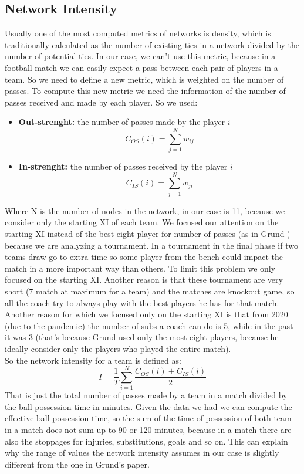 \documentclass[12pt, a4paper]{article}
\begin{document}
\subsection{Network Intensity}
Usually one of the most computed metrics of networks is density, which
is traditionally calculated as the number of existing ties in a network divided by the number of potential ties. In our case, we can't use this metric, because in a football match we can easily expect a pass between each pair of players in a team. So we need to define a new metric, which is weighted on the number of passes. To compute this new metric we need the information of the number of passes received and made by each player. So we used: 
\begin{itemize}
        \item \textbf{Out-strenght:} the number of passes made by the player $i$
        $$ C_{OS}(i) = \sum^{N}_{j=1}w_{ij}$$
        \item \textbf{In-strenght:} the number of passes received by the player $i$
         $$C_{IS}(i) = \sum^{N}_{j=1}w_{ji}$$
\end{itemize}
Where N is the number of nodes in the network, in our case is 11, because we consider only the starting XI of each team. We focused our attention on the starting XI instead of the best eight player for number of passes (as in Grund \cite{GRUND}) because we are analyzing a tournament. In a tournament in the final phase if two teams draw go to extra time so some player from the bench could impact the match in a more important way than others. To limit this problem we only focused on the starting XI. Another reason is that these tournament are very short (7 match at maximum for a team) and the matches are knockout game, so all the coach try to always play with the best players he has for that match. Another reason for which we focused only on the starting XI is that from 2020 (due to the pandemic) the number of subs a coach can do is 5, while in the past it was 3 (that's because Grund used only the most eight players, because he ideally consider only the players who played the entire match). \\
So the network intensity for a team is defined as:
$$I = \frac{1}{T}\sum^N_{i=1} \frac{ C_{OS}(i) +  C_{IS}(i)}{2}$$
That is just the total number of passes made by a team in a match divided by the ball possession time in minutes. Given the data we had we can compute the effective ball possession time, so the sum of the time of possession of both team in a match does not sum up to 90 or 120 minutes, because in a match there are also the stoppages for injuries, substitutions, goals and so on. This can explain why the range of values the network intensity assumes in our case is slightly different from the one in Grund's paper.
\\
\end{document}
